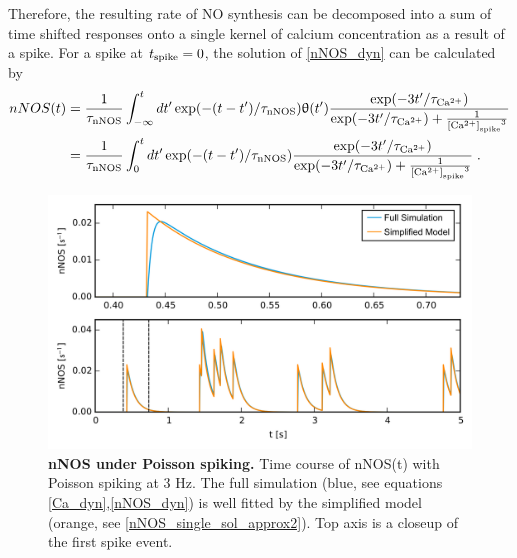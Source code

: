 \documentclass[10pt,letterpaper]{article}
\begin{document}
Therefore, the resulting rate of NO synthesis can be decomposed into a sum of time shifted responses onto a single kernel of calcium concentration as a result of a spike. For a spike at $t_{\rm spike}=0$, the solution of \eqref{nNOS_dyn} can be calculated by
\begin{equation}
\begin{split}
nNOS(t) &= \frac{1}{\tau_{\rm nNOS}}\int_{-\infty}^t dt' \exp(-(t-t')/\tau_{\rm nNOS}) \uptheta(t') \frac{\exp(-3t'/\tau_{\rm Ca^{2+}})}{\exp(-3t'/\tau_{\rm Ca^{2+}}) + \frac{1}{{{\rm [Ca^{2+}]}_{\rm spike}}^3}} \\
&= \frac{1}{\tau_{\rm nNOS}}\int_{0}^t dt' \exp(-(t-t')/\tau_{\rm nNOS}) \frac{\exp(-3t'/\tau_{\rm Ca^{2+}})}{\exp(-3t'/\tau_{\rm Ca^{2+}}) + \frac{1}{{{\rm [Ca^{2+}]}_{\rm spike}}^3}}\;.
\end{split}\label{nNOS_single_sol}
\end{equation}

\begin{figure}
\begin{center}
\includegraphics[width=\textwidth]{./figures/nNOS_approx.png}
\end{center}
\caption{{\bf nNOS under Poisson spiking.} Time course of nNOS(t) with Poisson spiking at 3 Hz. The full simulation (blue, see equations \eqref{Ca_dyn},\eqref{nNOS_dyn}) is well fitted by the simplified model (orange, see \eqref{nNOS_single_sol_approx2}). Top axis is a closeup of the first spike event.}
\label{nNOS_approx_plot}
\end{figure}
\end{document}

